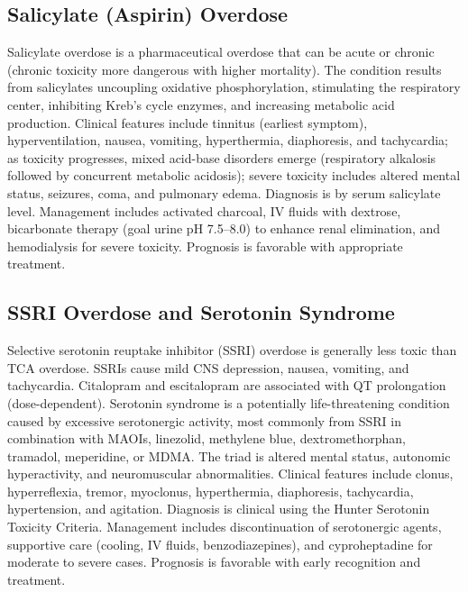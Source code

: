\subsection{Salicylate (Aspirin) Overdose}
\label{sec:Salicylate Overdose}
Salicylate overdose is a pharmaceutical overdose that can be acute or chronic (chronic toxicity more dangerous with higher mortality). The condition results from salicylates uncoupling oxidative phosphorylation, stimulating the respiratory center, inhibiting Kreb's cycle enzymes, and increasing metabolic acid production. Clinical features include tinnitus (earliest symptom), hyperventilation, nausea, vomiting, hyperthermia, diaphoresis, and tachycardia; as toxicity progresses, mixed acid-base disorders emerge (respiratory alkalosis followed by concurrent metabolic acidosis); severe toxicity includes altered mental status, seizures, coma, and pulmonary edema. Diagnosis is by serum salicylate level. Management includes activated charcoal, IV fluids with dextrose, bicarbonate therapy (goal urine pH 7.5--8.0) to enhance renal elimination, and hemodialysis for severe toxicity. Prognosis is favorable with appropriate treatment.

\subsection{SSRI Overdose and Serotonin Syndrome}
\label{sec:SSRI Overdose}
Selective serotonin reuptake inhibitor (SSRI) overdose is generally less toxic than TCA overdose. SSRIs cause mild CNS depression, nausea, vomiting, and tachycardia. Citalopram and escitalopram are associated with QT prolongation (dose-dependent). Serotonin syndrome is a potentially life-threatening condition caused by excessive serotonergic activity, most commonly from SSRI in combination with MAOIs, linezolid, methylene blue, dextromethorphan, tramadol, meperidine, or MDMA. The triad is altered mental status, autonomic hyperactivity, and neuromuscular abnormalities. Clinical features include clonus, hyperreflexia, tremor, myoclonus, hyperthermia, diaphoresis, tachycardia, hypertension, and agitation. Diagnosis is clinical using the Hunter Serotonin Toxicity Criteria. Management includes discontinuation of serotonergic agents, supportive care (cooling, IV fluids, benzodiazepines), and cyproheptadine for moderate to severe cases. Prognosis is favorable with early recognition and treatment.


